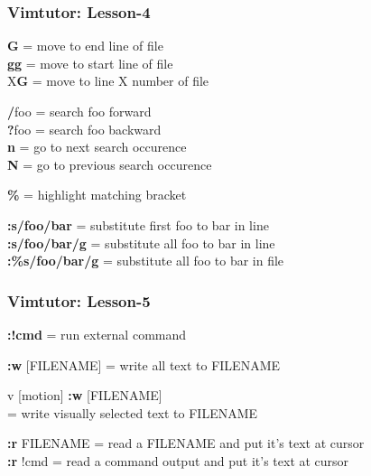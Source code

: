 \documentclass[table,dvipsnames]{beamer}
\begin{document}
	\begin{frame}
		\frametitle{Vimtutor: Lesson-4}
		\begin{exampleblock}{}
			\textbf{G} = move to end line of file\\
			\textbf{gg} = move to start line of file\\
			X\textbf{G} = move to line X number of file
		\end{exampleblock}
	
		\begin{exampleblock}{}
			\textbf{/}foo = search foo forward\\
			\textbf{?}foo = search foo backward\\
			\textbf{n} = go to next search occurence\\
			\textbf{N} = go to previous search occurence
		\end{exampleblock}
	
		\begin{exampleblock}{}
			\textbf{\%} = highlight matching bracket\\
		\end{exampleblock}
	
		\begin{exampleblock}{}
			\textbf{:s/foo/bar} = substitute first foo to bar in line\\
			\textbf{:s/foo/bar/g} = substitute all foo to bar in line\\
			\textbf{:\%s/foo/bar/g} = substitute all foo to bar in file
		\end{exampleblock}
	\end{frame}

	\begin{frame}
		\frametitle{Vimtutor: Lesson-5}
		\begin{exampleblock}{}
			\textbf{:!cmd} = run external command
		\end{exampleblock}
	
		\begin{exampleblock}{}
			\textbf{:w} [FILENAME] = write all text to FILENAME
		\end{exampleblock}
	
		\begin{exampleblock}{}
			\Esc v [motion] \textbf{:w} [FILENAME] \\
			= write visually selected text to FILENAME
		\end{exampleblock}
	
		\begin{exampleblock}{}
			\textbf{:r} FILENAME = read a FILENAME and put it's text at cursor\\
			\textbf{:r} !cmd = read a command output and put it's text at cursor
		\end{exampleblock}
	\end{frame}
\end{document}
